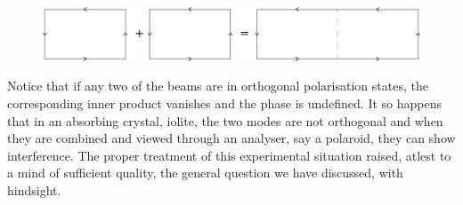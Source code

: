 \begin{figure}[H]
\centering
\includegraphics[scale=0.18]{src/images/chap26/13.jpg}
\end{figure}
\bigskip

Notice that if any two of the beams are in orthogonal polarisation states, the
corresponding inner product vanishes and the phase is undefined. It so happens
that in an absorbing crystal, iolite, the two modes are not orthogonal and when
they are combined and viewed through an analyser, say a polaroid, they can show  interference. 
The proper treatment of this experimental situation raised, atlest to a mind of sufficient
quality, the general question we have discussed, with hindsight.

